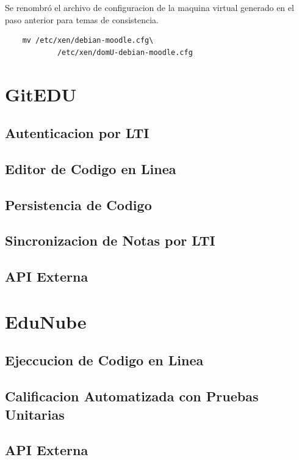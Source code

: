 Se renombró el archivo de configuracion de la maquina virtual generado en el paso anterior para temas de consistencia.

\begin{lstlisting}
	mv /etc/xen/debian-moodle.cfg\
    		/etc/xen/domU-debian-moodle.cfg
\end{lstlisting}

\section{GitEDU}

\subsection{Autenticacion por LTI}

\subsection{Editor de Codigo en Linea}

\subsection{Persistencia de Codigo}

\subsection{Sincronizacion de Notas por LTI}

\subsection{API Externa}

\section{EduNube}

\subsection{Ejeccucion de Codigo en Linea}

\subsection{Calificacion Automatizada con Pruebas Unitarias}

\subsection{API Externa}
